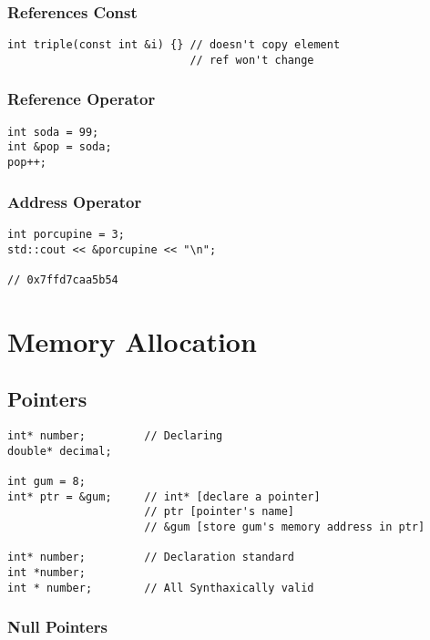 \subsection{References Const}

\begin{verbatim}
int triple(const int &i) {} // doesn't copy element
                            // ref won't change
\end{verbatim}

\subsection{Reference Operator}

\begin{verbatim}
int soda = 99; 
int &pop = soda;
pop++;
\end{verbatim}

\subsection{Address Operator}

\begin{verbatim}
int porcupine = 3; 
std::cout << &porcupine << "\n"; 

// 0x7ffd7caa5b54
\end{verbatim}

\chapter{Memory Allocation}
\section{Pointers}

\begin{verbatim}
int* number;         // Declaring
double* decimal;

int gum = 8;
int* ptr = &gum;     // int* [declare a pointer]
                     // ptr [pointer's name]
                     // &gum [store gum's memory address in ptr]

int* number;         // Declaration standard
int *number;
int * number;        // All Synthaxically valid
\end{verbatim}

\subsection{Null Pointers}

